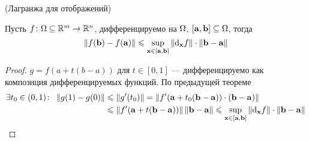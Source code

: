 \begin{theorem}(Лагранжа для отображений)

    Пусть $f \colon \Omega \subseteq \mathbb{R}^m \to \mathbb{R}^n$, дифференцируемо на $\Omega$,
    $[\mathbf{a}, \mathbf{b}] \subseteq \Omega$, тогда
\[
    \left\lVert f(\mathbf{b}) - f(\mathbf{a})\right\rVert \leqslant \sup_{\mathbf{x} \in [\mathbf{a},
    \mathbf{b}]}{\left\lVert\mathrm{d}_{\mathbf{x}}{f}\right\rVert} \cdot \left\lVert\mathbf{b} - \mathbf{a}\right\rVert
\]
\end{theorem}
\begin{proof}

    $g = f(a + t(b - a))$ для $t \in [0, 1]$ --- дифференцируемо как композиция
    дифференцируемых функций. По предыдущей теореме
\begin{align*}
    \exists t_0 \in (0, 1)\colon~ \left\lVert g(1) - g(0)\right\rVert &\leqslant \left\lVert g'(t_0)\right\rVert
    = \left\lVert f'(\mathbf{a} + t_0(\mathbf{b} - \mathbf{a})) \cdot (\mathbf{b} - \mathbf{a})\right\rVert \\
    &\leqslant \left\lVert f'(\mathbf{a} + t(\mathbf{b} - \mathbf{a}))\right\rVert
    \left\lVert\mathbf{b} - \mathbf{a}\right\rVert \leqslant \sup_{\mathbf{x} \in [\mathbf{a},
    \mathbf{b}]}{\left\lVert\mathrm{d}_{\mathbf{x}}{f}\right\rVert} \cdot \left\lVert\mathbf{b} - \mathbf{a}\right\rVert
\end{align*}
\end{proof}
